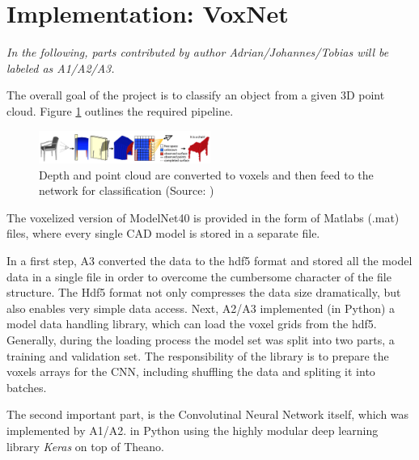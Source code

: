 \documentclass[10pt,twocolumn,letterpaper]{article}
\begin{document}
\section{Implementation: VoxNet \cite{voxnet}}

\textit{In the following, parts contributed by author Adrian/Johannes/Tobias will be labeled 
as A1/A2/A3.}\newline

The overall goal of the project is to classify an object from a given 3D point cloud. Figure \ref{fig:algo} outlines 
the required pipeline.

\begin{figure}[h]
	\label{fig:algo}
	\centering
	\includegraphics[width=0.5\textwidth]{figures/algo}
	\caption{ Depth and point cloud are converted to voxels and then feed to the network 
	for classification  (Source: \cite{shape})}
\end{figure}

The voxelized version of ModelNet40 is provided in the form of Matlabs (.mat) files, where every single CAD model is stored 
in a separate file.

In a first step, A3 converted the data to the hdf5 format and stored all the model data in a single file in order to overcome 
the cumbersome character of the file structure. The Hdf5 format not only compresses the data size dramatically, but also enables
very simple data access. 
Next, A2/A3 implemented (in Python) a model data handling library, which can load the voxel grids from the hdf5. Generally, during the loading 
process the model set was split into two parts, a training and validation set. The responsibility of the library is to prepare 
the voxels arrays for the CNN, including shuffling the data and spliting it into batches.



The second important part, is the Convolutinal Neural Network itself, which was implemented by A1/A2. in Python
using the highly modular deep learning library \textit{Keras} on top of Theano.
\end{document}
